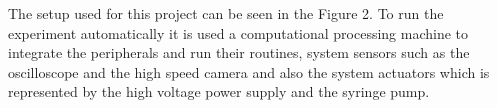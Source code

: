 The setup used for this project can be seen in the Figure 2. To run the experiment automatically it is used a computational processing machine to integrate the peripherals and run their routines, system sensors such as the oscilloscope and the high speed camera 
and also the system actuators which is represented by the high voltage power supply and the syringe pump. 




    

    
